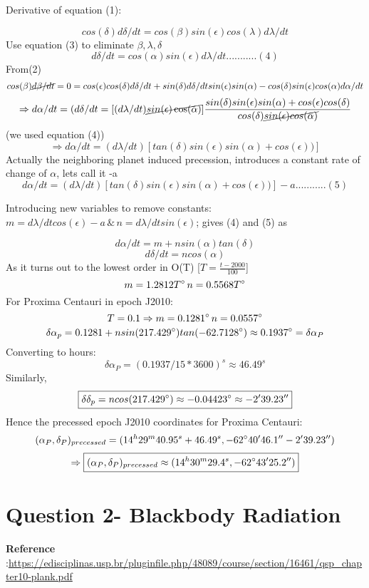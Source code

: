 \documentclass[11pt]{article}
\begin{document}
		Derivative of equation (1):
		
		\[
		cos(\delta)d\delta/dt = cos(\beta)sin(\epsilon)cos(\lambda)d\lambda/dt
		\]
		Use equation (3) to eliminate $\beta, \lambda, \delta$
		\[
		d\delta/dt = cos(\alpha)sin(\epsilon)d\lambda/dt...........(4)
		\]
		From(2)
		\[
		cos(\beta)\cancel{d\beta/dt} = 0 = cos(\epsilon)cos(\delta)d\delta/dt + sin(\delta)d\delta/dt sin(\epsilon) sin(\alpha) - cos(\delta)sin(\epsilon)cos(\alpha)d\alpha/dt
		\]
		\[
		\Rightarrow d\alpha/dt = (d\delta/dt = [(d\lambda/dt)\cancel{sin(\epsilon)\cos(\alpha)}]\frac{sin(\delta)sin(\epsilon)sin(\alpha)+cos(\epsilon)cos(\delta)}{cos(\delta)\cancel{sin(\epsilon)cos(\alpha)}}
		\]
		(we used equation (4))
		\[
		\Rightarrow d\alpha/dt = (d\lambda/dt)[tan(\delta)sin(\epsilon) sin(\alpha) + cos(\epsilon))]
		\]
		Actually the neighboring planet induced precession, introduces a constant rate of change of $\alpha$, lets call it -a
		\[
		d\alpha/dt = (d\lambda/dt)[tan(\delta)sin(\epsilon) sin(\alpha) + cos(\epsilon))] - a...........(5)
		\]
		
		Introducing new variables to remove constants:
		$m = d\lambda/dt cos(\epsilon) - a \, \& \, n = d\lambda/dt sin(\epsilon)$; gives (4) and (5) as
		
		
		\[
		d\alpha/dt = m + nsin(\alpha)tan(\delta) 
		\]
		\[
		d\delta/dt = ncos(\alpha)
		\]
		As it turns out to the lowest order in O(T) [$T = \frac{t-2000}{100}$]
		\[
		m = 1.2812 T \degree \, n = 0.5568 T \degree 
		\]
		For Proxima Centauri in epoch J2010:\\
		\[ T = 0.1 \Rightarrow m = 0.1281 \degree \, n = 0.0557 \degree\]
		\[
		\delta \alpha_p = 0.1281 +  nsin(217.429\degree)tan(-62.7128\degree) \approx 0.1937\degree =\delta \alpha_P
		\]
		Converting to hours:
		\[
		\boxed{\delta \alpha_P = (0.1937/15 *3600) ^s \approx 46.49^s}
		\]
		Similarly,
		\[
		\boxed{\delta \delta_p = ncos(217.429\degree) \approx -0.04423\degree \approx -2'39.23'' }
		\]
		Hence the precessed epoch J2010 coordinates for Proxima Centauri:
		\[
		(\alpha_P,\delta_P)_{precessed} = (14^h29^m40.95^s + 46.49^s, -62\degree40'46.1'' - 2'39.23'')
		\]
		\[
		\Rightarrow \boxed{(\alpha_P,\delta_P)_{precessed} \approx (14^h 30^m 29.4^s , -62\degree43'25.2'' )}
		\]
		
		\section*{\color{teal} Question 2- Blackbody Radiation}
		
		\textbf{Reference} :\url{https://edisciplinas.usp.br/pluginfile.php/48089/course/section/16461/qsp_chapter10-plank.pdf}
\end{document}
